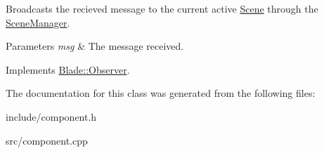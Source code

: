 Broadcasts the recieved message to the current active \hyperlink{class_blade_1_1_scene}{Scene} through the \hyperlink{class_blade_1_1_scene_manager}{Scene\+Manager}. 


\begin{DoxyParams}{Parameters}
{\em msg} & The message received. \\
\hline
\end{DoxyParams}


Implements \hyperlink{class_blade_1_1_observer}{Blade\+::\+Observer}.



The documentation for this class was generated from the following files\+:\begin{DoxyCompactItemize}
\item 
include/component.\+h\item 
src/component.\+cpp\end{DoxyCompactItemize}
